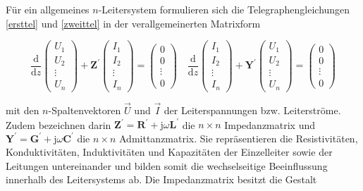 Für ein allgemeines $n$-Leitersystem formulieren sich die Telegraphengleichungen \ref{ersttel} und \ref{zweittel} in der verallgemeinerten Matrixform

\begin{equation}\label{verallgmatr}
	\frac{\mathrm{d}}{\mathrm{d} z}\left(\begin{array}{c}
		U_{1}  \\
		U_{2} \\
		\vdots \\
		U_{n}
	\end{array}\right)+\mathbf{Z}^{\prime}\left(\begin{array}{c}
		I_{1} \\
		I_{2} \\
		\vdots \\
		I_{n}
	\end{array}\right)=\left(\begin{array}{c}
		0 \\
		0 \\
		\vdots \\
		0
	\end{array}\right) \quad \frac{\mathrm{d}}{\mathrm{d} z}\left(\begin{array}{c}
		I_{1} \\
		I_{2} \\
		\vdots \\
		I_{n}
	\end{array}\right)+\mathbf{Y}^{\prime}\left(\begin{array}{c}
		U_{1} \\
		U_{2} \\
		\vdots \\
		U_{n}
	\end{array}\right)=\left(\begin{array}{c}
		0 \\
		0 \\
		\vdots \\
		0
	\end{array}\right)
\end{equation}

mit den $n$-Spaltenvektoren $\vec{U}$ und $\vec{I}$ der Leiterspannungen bzw. Leiterströme. Zudem bezeichnen darin $\mathbf{Z}^{\prime}=\mathbf{R}^{\prime}+\mathrm{j} \omega \mathbf{L}^{\prime}$ die $n \times n$ Impedanzmatrix und $\mathbf{Y}^{\prime}=\mathbf{G}^{\prime}+\mathrm{j} \omega \mathbf{C}^{\prime}$ die $n \times n$ Admittanzmatrix. Sie repräsentieren die Resistivitäten, Konduktivitäten, Induktivitäten und Kapazitäten der Einzelleiter sowie der Leitungen untereinander und bilden somit die wechselseitige Beeinflussung innerhalb des Leitersystems ab. Die Impedanzmatrix besitzt die Gestalt

